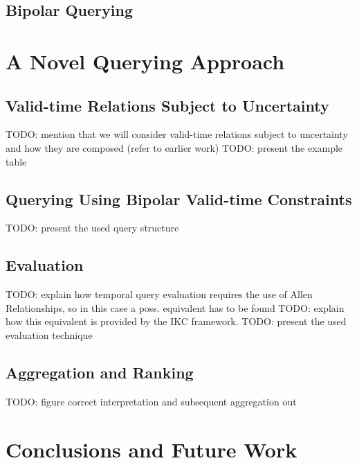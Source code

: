 \documentclass[runningheads,a4paper]{llncs}
\begin{document}
\subsection{Bipolar Querying}

\section{A Novel Querying Approach\label{sec:proposal}}

\subsection{Valid-time Relations Subject to Uncertainty}
TODO: mention that we will consider valid-time relations subject to uncertainty and how they are composed (refer to earlier work)
TODO: present the example table

\subsection{Querying Using Bipolar Valid-time Constraints}
TODO: present the used query structure

\subsection{Evaluation}
TODO: explain how temporal query evaluation requires the use of Allen Relationships, so in this case a poss. equivalent has to be found
TODO: explain how this equivalent is provided by the IKC framework.
TODO: present the used evaluation technique

\subsection{Aggregation and Ranking}
TODO: figure correct interpretation and subsequent aggregation out


\section{Conclusions and Future Work\label{sec:conclusions}}




\end{document}
